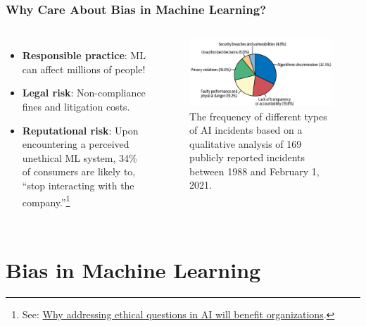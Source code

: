 \documentclass[11pt,aspectratio=169,hyperref={colorlinks}]{beamer}
\begin{document}
		\begin{frame}				
		
			\frametitle{Why Care About Bias in Machine Learning?}
			
			\begin{columns}
			
			\begin{itemize}\small
				\item \textbf{Responsible practice}: ML can affect millions of people! \cite{obermeyer2019dissecting}
				\item \textbf{Legal risk}: Non-compliance fines and litigation costs.
				\item \textbf{Reputational risk}: Upon encountering a perceived unethical ML system, 34\% of consumers are likely to, ``stop interacting with the company.''\footnote{\scriptsize{See: \href{https://www.capgemini.com/research/why-addressing-ethical-questions-in-ai-will-benefit-organizations/}{Why addressing ethical questions in AI will benefit organizations}.}}
			\end{itemize}
			
			\centering
			\begin{figure}
			\includegraphics[scale=0.16]{../img/bias_incidents.png}
			\caption{\scriptsize{The frequency of different types of AI incidents based on a qualitative analysis of 169 publicly reported incidents between 1988 and February 1, 2021.}}
			\end{figure}
			
			\end{columns}
			
		\end{frame}

	\section{Bias in Machine Learning}
	
\end{document}
